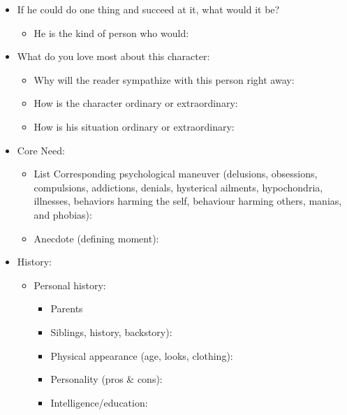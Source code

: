 \documentclass[openleft,oneside,showtrims]{memoir}
\begin{document}
\begin{itemize}
\begin{itemize}
\begin{itemize}
\item If he could do one thing and succeed at it, what would it be?
\label{sec:org81ff94d}

\begin{itemize}
\item He is the kind of person who would:
\end{itemize}

\item What do you love most about this character:
\label{sec:orgea38d23}

\begin{itemize}
\item Why will the reader sympathize with this person right away:

\item How is the character ordinary or extraordinary:

\item How is his situation ordinary or extraordinary:
\end{itemize}

\item Core Need:
\label{sec:org4df7775}

\begin{itemize}
\item List Corresponding psychological maneuver (delusions, obsessions, compulsions,  addictions, denials, hysterical ailments, hypochondria, illnesses, behaviors  harming the self, behaviour harming others, manias, and phobias):

\item Anecdote (defining moment):
\end{itemize}

\item History:
\label{sec:org3072d14}

\begin{itemize}
\item Personal history:
\label{sec:org69f1d37}

\begin{itemize}
\item Parents

\item Siblings, history, backstory):

\item Physical appearance (age, looks, clothing):

\item Personality (pros \& cons):

\item Intelligence/education:


\end{itemize}
\end{itemize}
\end{itemize}
\end{itemize}
\end{itemize}
\end{document}

